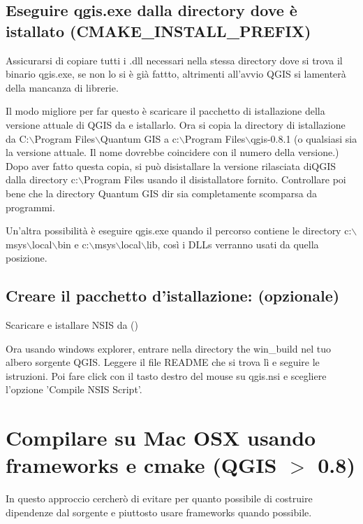 \subsection{Eseguire qgis.exe dalla directory dove è istallato (CMAKE\_INSTALL\_PREFIX)}
Assicurarsi di copiare tutti i .dll necessari nella stessa directory dove si trova il binario qgis.exe, se non lo si è già fattto, altrimenti all'avvio QGIS si lamenterà della mancanza di librerie.

Il modo migliore per far questo è scaricare il pacchetto di istallazione della versione attuale di QGIS da  e istallarlo. Ora si copia la directory di istallazione da C:$\backslash$Program Files$\backslash$Quantum GIS a c:$\backslash$Program
Files$\backslash$qgis-0.8.1 (o qualsiasi sia la versione attuale. Il nome dovrebbe coincidere con il numero della versione.) Dopo aver fatto questa copia, si può disistallare la versione rilasciata diQGIS dalla directory c:$\backslash$Program Files usando il disistallatore fornito. Controllare poi bene che la directory Quantum GIS dir sia completamente scomparsa da programmi.

Un'altra possibilità è eseguire qgis.exe quando il percorso contiene le directory
c:$\backslash$msys$\backslash$local$\backslash$bin e c:$\backslash$msys$\backslash$local$\backslash$lib, così i DLLs verranno usati da quella posizione.

\subsection{Creare il pacchetto d'istallazione: (opzionale)}
Scaricare e istallare NSIS da ()

Ora usando windows explorer, entrare nella directory the win\_build nel tuo albero sorgente QGIS. Leggere il file README che si trova lì e seguire le istruzioni. Poi fare click con il tasto destro del mouse su qgis.nsi e scegliere l'opzione 'Compile NSIS Script'.


\section{Compilare su Mac OSX usando frameworks e cmake (QGIS $>$ 0.8)}\label{sec:install_macosx}
In questo approccio cercherò di evitare per quanto possibile di costruire dipendenze dal sorgente e piuttosto usare frameworks quando possibile.


